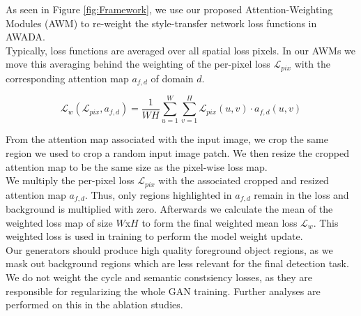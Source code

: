 \documentclass[10pt,twocolumn,letterpaper]{article}
\begin{document}
As seen in Figure \ref{fig:Framework}, we use our proposed Attention-Weighting Modules (AWM) to re-weight the style-transfer network loss functions in AWADA. \\
Typically, loss functions are averaged over all spatial loss pixels. In our AWMs we move this averaging behind the weighting of the per-pixel loss $\mathcal{L}_{pix}$ with the corresponding attention map $a_{f,d}$ of domain $d$.

\begin{equation}
	\mathcal{L}_{w}(\mathcal{L}_{pix}, a_{f,d}) = \dfrac{1}{WH}\sum_{u=1}^{W} \sum_{v=1}^{H} \mathcal{L}_{pix}(u,v) \cdot a_{f,d}(u,v)
\end{equation}

From the attention map associated with the input image, we crop the same region we used to crop a random input image patch. We then resize the cropped attention map to be the same size as the pixel-wise loss map.\\
We multiply the per-pixel loss $\mathcal{L}_{pix}$ with the associated cropped and resized attention map $a_{f,d}$. Thus, only regions highlighted in $a_{f,d}$ remain in the loss and background is multiplied with zero. Afterwards we calculate the mean of the weighted loss map of size $W$x$H$ to form the final weighted mean loss $\mathcal{L}_{w}$. This weighted loss is used in training to perform the model weight update.\\
Our generators should produce high quality foreground object regions, as we mask out background regions which are less relevant for the final detection task. We do not weight the cycle and semantic constsiency losses, as they are responsible for regularizing the whole GAN training. Further analyses are performed on this in the ablation studies.
\end{document}
